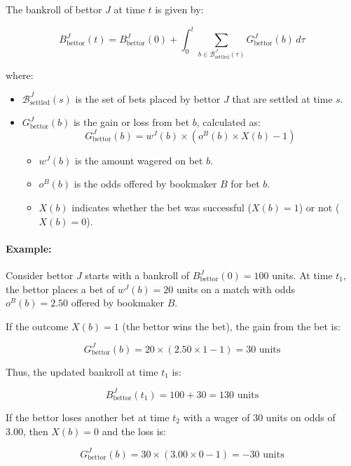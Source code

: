 The bankroll of bettor \( J \) at time \( t \) is given by:

\[
B_{\text{bettor}}^J(t) = B_{\text{bettor}}^J(0) + \int_0^t \sum_{b \in \mathcal{B}_{\text{settled}}^J(\tau)} G_{\text{bettor}}^J(b) \, d\tau
\]

where:

\begin{itemize}
    \item \( \mathcal{B}_{\text{settled}}^{J}(s) \) is the set of bets placed by bettor \( J \) that are settled at time \( s \).
    \item \( G_{\text{bettor}}^J(b) \) is the gain or loss from bet \( b \), calculated as:
    \[
    G_{\text{bettor}}^J(b) = w^{J}(b) \times \left( o^{B}(b) \times X(b) - 1 \right)
    \]
    \begin{itemize}
        \item \( w^{J}(b) \) is the amount wagered on bet \( b \).
        \item \( o^{B}(b) \) is the odds offered by bookmaker \( B \) for bet \( b \).
        \item \( X(b) \) indicates whether the bet was successful (\( X(b) = 1 \)) or not (\( X(b) = 0 \)).
    \end{itemize}
\end{itemize}

\paragraph{Example:}

Consider bettor \( J \) starts with a bankroll of \( B_{\text{bettor}}^J(0) = 100 \) units. At time \( t_1 \), the bettor places a bet of \( w^{J}(b) = 20 \) units on a match with odds \( o^{B}(b) = 2.50 \) offered by bookmaker \( B \).

If the outcome \( X(b) = 1 \) (the bettor wins the bet), the gain from the bet is:

\[
G_{\text{bettor}}^J(b) = 20 \times (2.50 \times 1 - 1) = 30 \text{ units}
\]

Thus, the updated bankroll at time \( t_1 \) is:

\[
B_{\text{bettor}}^J(t_1) = 100 + 30 = 130 \text{ units}
\]

If the bettor loses another bet at time \( t_2 \) with a wager of 30 units on odds of 3.00, then \( X(b) = 0 \) and the loss is:

\[
G_{\text{bettor}}^J(b) = 30 \times (3.00 \times 0 - 1) = -30 \text{ units}
\]

